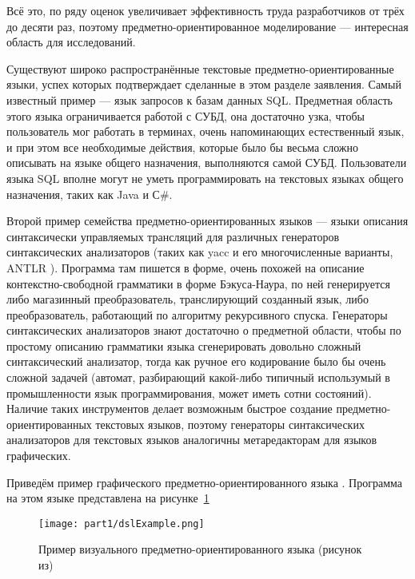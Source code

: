 Всё это, по ряду оценок
увеличивает эффективность труда разработчиков от трёх до десяти раз, поэтому 
предметно-ориентированное моделирование --- интересная область для исследований.

Существуют широко распространённые текстовые предметно-ориентированные языки, 
успех которых подтверждает сделанные в этом разделе заявления. Самый известный 
пример --- язык запросов к базам данных SQL. Предметная область этого языка 
ограничивается работой с СУБД, она достаточно узка, чтобы пользователь мог 
работать в терминах, очень напоминающих естественный язык, и при этом все 
необходимые действия, которые было бы весьма сложно описывать на языке общего 
назначения, выполняются самой СУБД. Пользователи языка SQL вполне могут не уметь 
программировать на текстовых языках общего назначения, таких как Java и С\#. 

Второй пример семейства предметно-ориентированных языков --- языки описания 
синтаксически управляемых трансляций для различных генераторов синтаксических 
анализаторов (таких как yacc и его многочисленные варианты, ANTLR
). Программа там пишется в форме, очень похожей на описание контекстно-свободной 
грамматики в форме Бэкуса-Наура, по ней генерируется либо магазинный 
преобразователь, транслирующий созданный язык, либо преобразователь, работающий 
по алгоритму рекурсивного спуска. Генераторы синтаксических анализаторов знают 
достаточно о предметной области, чтобы по простому описанию грамматики языка 
сгенерировать довольно сложный синтаксический анализатор, тогда как ручное его 
кодирование было бы очень сложной задачей (автомат, разбирающий какой-либо 
типичный использумый в промышленности язык программирования, может иметь сотни 
состояний). Наличие таких инструментов делает возможным быстрое создание 
предметно-ориентированных текстовых языков, поэтому генераторы синтаксических 
анализаторов для текстовых языков аналогичны метаредакторам для языков 
графических.

Приведём пример графического предметно-ориентированного языка 
. Программа на этом языке представлена на рисунке~\ref{dslExample}

\begin{figure} [ht]
	\begin{center}
		\texttt{[image: part1/dslExample.png]}
		\caption{Пример визуального предметно-ориентированного языка (рисунок из\cite{kelly2008domain})}
		\label{dslExample}
	\end{center}
\end{figure}

